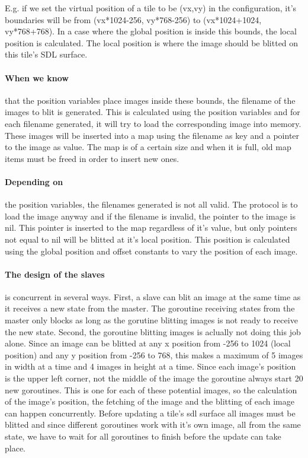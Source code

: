 \documentclass[12pt, a4paper, oneside]{article}
\begin{document}
E.g. if we set the virtual position of a tile to be (vx,vy) in the configuration, it's boundaries will be from (vx*1024-256, vy*768-256) to (vx*1024+1024, vy*768+768). In a case where the global position is inside this bounds, the local position is calculated. The local position is where the image should be blitted on this tile's SDL surface.

\paragraph{When we know}
that the position variables place images inside these bounds, the filename of the images to blit is generated. This is calculated using the position variables and for each filename generated, it will try to load the corresponding image into memory. These images will be inserted into a map using the filename as key and a pointer to the image as value. The map is of a certain size and when it is full, old map items must be freed in order to insert new ones.

\paragraph{Depending on}
the position variables, the filenames generated is not all valid. The protocol is to load the image anyway and if the filename is invalid, the pointer to the image is nil. This pointer is inserted to the map regardless of it's value, but only pointers not equal to nil will be blitted at it's local position. This position is calculated using the global position and offset constants to vary the position of each image.    

\paragraph{The design of the slaves} 
is concurrent in several ways. First, a slave can blit an image at the same time as it receives a new state from the master. The goroutine receiving states from the master only blocks as long as the gorutine blitting images is not ready to receive the new state.
Second, the goroutine blitting images is aclually not doing this job alone. Since an image can be blitted at any x position from -256 to 1024 (local position) and any y position from -256 to 768, this makes a maximum of 5 images in width at a time and 4 images in height at a time. Since each image's position is the upper left corner, not the middle of the image the goroutine always start 20 new goroutines. This is one for each of these potential images, so the calculation of the image's position, the fetching of the image and the blitting of each image can happen concurrently. Before updating a tile's sdl surface all images must be blitted and since different goroutines work with it's own image, all from the same state, we have to wait for all goroutines to finish before the update can take place.
\end{document}
